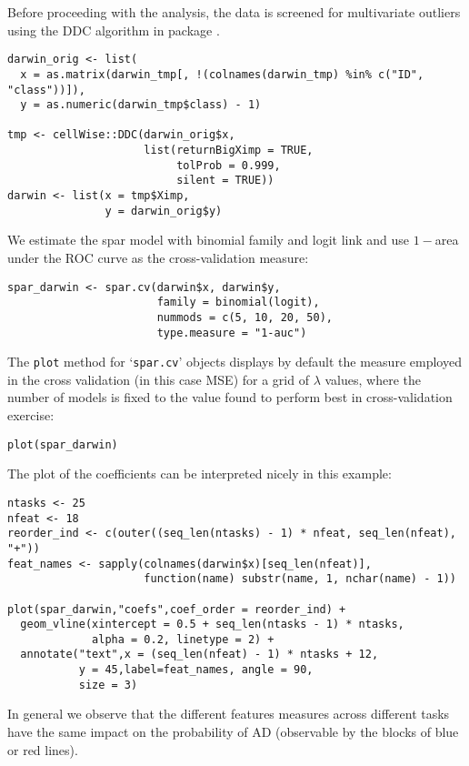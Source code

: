 \documentclass[
  article]{jss}
\begin{document}
Before proceeding with the analysis, the data is screened for
multivariate outliers using the DDC algorithm in package .

\begin{verbatim}
darwin_orig <- list(
  x = as.matrix(darwin_tmp[, !(colnames(darwin_tmp) %in% c("ID", "class"))]),
  y = as.numeric(darwin_tmp$class) - 1)

tmp <- cellWise::DDC(darwin_orig$x,
                     list(returnBigXimp = TRUE, 
                          tolProb = 0.999,
                          silent = TRUE))
darwin <- list(x = tmp$Ximp,
               y = darwin_orig$y)
\end{verbatim}

We estimate the spar model with binomial family and logit link and use
\(1-\)area under the ROC curve as the cross-validation measure:

\begin{verbatim}
spar_darwin <- spar.cv(darwin$x, darwin$y,
                       family = binomial(logit),
                       nummods = c(5, 10, 20, 50),
                       type.measure = "1-auc")
\end{verbatim}

The \texttt{plot} method for `\texttt{spar.cv}' objects displays by
default the measure employed in the cross validation (in this case MSE)
for a grid of \(\lambda\) values, where the number of models is fixed to
the value found to perform best in cross-validation exercise:

\begin{verbatim}
plot(spar_darwin)
\end{verbatim}

The plot of the coefficients can be interpreted nicely in this example:

\begin{verbatim}
ntasks <- 25
nfeat <- 18
reorder_ind <- c(outer((seq_len(ntasks) - 1) * nfeat, seq_len(nfeat), "+"))
feat_names <- sapply(colnames(darwin$x)[seq_len(nfeat)],
                     function(name) substr(name, 1, nchar(name) - 1))

plot(spar_darwin,"coefs",coef_order = reorder_ind) + 
  geom_vline(xintercept = 0.5 + seq_len(ntasks - 1) * ntasks, 
             alpha = 0.2, linetype = 2) +
  annotate("text",x = (seq_len(nfeat) - 1) * ntasks + 12,
           y = 45,label=feat_names, angle = 90,
           size = 3)
\end{verbatim}

In general we observe that the different features measures across
different tasks have the same impact on the probability of AD
(observable by the blocks of blue or red lines).
\end{document}
